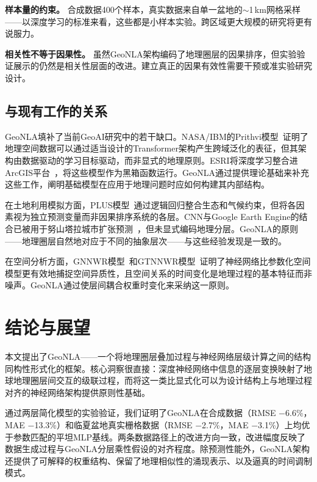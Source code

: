 \documentclass[11pt,a4paper]{article}
\begin{document}
\textbf{样本量的约束。} 合成数据400个样本，真实数据来自单一盆地的$\sim$1\,km网格采样——以深度学习的标准来看，这些都是小样本实验。跨区域更大规模的研究将更有说服力。

\textbf{相关性不等于因果性。} 虽然GeoNLA架构编码了地理圈层的因果排序，但实验验证展示的仍然是相关性层面的改进。建立真正的因果有效性需要干预或准实验研究设计。

\subsection{与现有工作的关系}

GeoNLA填补了当前GeoAI研究中的若干缺口。NASA/IBM的Prithvi模型~\cite{jakubik2024}证明了地理空间数据可以通过适当设计的Transformer架构产生跨域泛化的表征，但其架构由数据驱动的学习目标驱动，而非显式的地理原则。ESRI将深度学习整合进ArcGIS平台~\cite{esri2026}，将这些模型作为黑箱函数运行。GeoNLA通过提供理论基础来补充这些工作，阐明基础模型在应用于地理问题时应如何构建其内部结构。

在土地利用模拟方面，PLUS模型~\cite{liang2021}通过逻辑回归整合生态和气候约束，但将各因素视为独立预测变量而非因果排序系统的各层。CNN与Google Earth Engine的结合已被用于努山塔拉城市扩张预测~\cite{miru2025}，但未显式编码地理分层。GeoNLA的原则——地理圈层自然地对应于不同的抽象层次——与这些经验发现是一致的。

在空间分析方面，GNNWR模型~\cite{du2020}和GTNNWR模型~\cite{wu2021}证明了神经网络比参数化空间模型更有效地捕捉空间异质性，且空间关系的时间变化是地理过程的基本特征而非噪声。GeoNLA通过使层间耦合权重时变化来采纳这一原则。

\section{结论与展望}
\label{sec:conclusion}

本文提出了GeoNLA——一个将地理圈层叠加过程与神经网络层级计算之间的结构同构性形式化的框架。核心洞察很直接：深度神经网络中信息的逐层变换映射了地球地理圈层间交互的级联过程，而将这一类比显式化可以为设计结构上与地理过程对齐的神经网络架构提供原则性基础。

通过两层简化模型的实验验证，我们证明了GeoNLA在合成数据（RMSE $-$6.6\%，MAE $-$13.3\%）和临夏盆地真实栅格数据（RMSE $-$2.7\%，MAE $-$3.1\%）上均优于参数匹配的平坦MLP基线。两条数据路径上的改进方向一致，改进幅度反映了数据生成过程与GeoNLA分层乘性假设的对齐程度。除预测性能外，GeoNLA架构还提供了可解释的权重结构、保留了地理相似性的涌现表示、以及逼真的时间调制模式。
\end{document}
